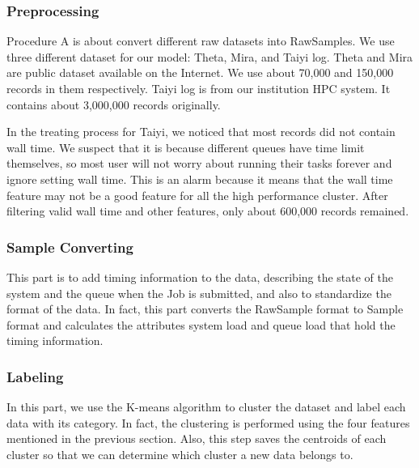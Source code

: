 \documentclass[conference,compsoc]{IEEEtran}
\begin{document}
\subsubsection{Preprocessing}
Procedure A is about convert different raw datasets into RawSamples. We use three different dataset for our model: Theta, Mira, and Taiyi log. Theta and Mira are public dataset available on the Internet. We use about 70,000 and 150,000 records in them respectively. Taiyi log is from our institution HPC system. It contains about 3,000,000 records originally.

In the treating process for Taiyi, we noticed that most records did not contain wall time. We suspect that it is because different queues have time limit themselves, so most user will not worry about running their tasks forever and ignore setting wall time. This is an alarm because it means that the wall time feature may not be a good feature for all the high performance cluster. After filtering valid wall time and other features, only about 600,000 records remained.


\subsubsection{Sample Converting}
This part is to add timing information to the data, describing the state of the system and the queue when the Job is submitted, and also to standardize the format of the data. In fact, this part converts the RawSample format to Sample format and calculates the attributes system load and queue load that hold the timing information.

\subsubsection{Labeling}
In this part, we use the K-means algorithm to cluster the dataset and label each data with its category. In fact, the clustering is performed using the four features mentioned in the previous section. Also, this step saves the centroids of each cluster so that we can determine which cluster a new data belongs to.
\end{document}

